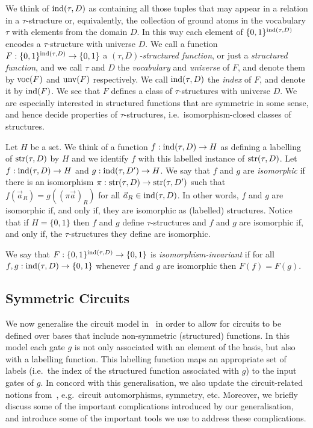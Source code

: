 \documentclass[a4paper,UKenglish]{lipics-v2018}
\begin{document}
We think of $\text{\upshape ind}(\tau, D)$ as containing all those tuples that may appear in a
relation in a $\tau$-structure or, equivalently, the collection of ground atoms
in the vocabulary $\tau$ with elements from the domain $D$. In this way each
element of $\{0,1\}^{\text{\upshape ind}(\tau, D)}$ encodes a $\tau$-structure with universe
$D$. We call a function $F : \{0,1\}^{\text{\upshape ind}(\tau, D)} \rightarrow \{0,1\}$ a
\emph{$(\tau, D)$-structured function}, or just a \emph{structured function}, and
we call $\tau$ and $D$ the \emph{vocabulary} and \emph{universe} of $F$, and
denote them by $\text{voc}(F)$ and $\text{unv}(F)$ respectively. We call $\text{\upshape ind}(\tau,
D)$ the \emph{index} of $F$, and denote it by $\text{\upshape ind}(F)$. We see that $F$ defines
a class of $\tau$-structures with universe $D$. We are especially interested in
structured functions that are symmetric in some sense, and hence decide
properties of $\tau$-structures, i.e.\ isomorphism-closed classes of structures.

Let $H$ be a set. We think of a function $f : \text{\upshape ind}(\tau, D) \rightarrow H$ as
defining a labelling of $\text{str}(\tau,D)$ by $H$ and we identify $f$ with this
labelled instance of $\text{str}(\tau, D)$. Let $f: \text{\upshape ind}(\tau, D) \rightarrow H$ and $g : \text{\upshape ind}
(\tau, D') \rightarrow H$. We say that $f$ and $g$ are \emph{isomorphic} if there is an
isomorphism $\pi : \text{str}(\tau, D) \rightarrow \text{str}(\tau, D')$ such that $f(\vec{a}_R) =
g((\pi\vec{a})_R)$ for all $\vec{a}_R \in \text{\upshape ind}(\tau, D)$. In other words, $f$
and $g$ are isomorphic if, and only if, they are isomorphic as (labelled)
structures. Notice that if $H = \{0,1\}$ then $f$ and $g$ define
$\tau$-structures and $f$ and $g$ are isomorphic if, and only if, the
$\tau$-structures they define are isomorphic.

We say that $F : \{0,1\}^{\text{\upshape ind}(\tau,D)} \rightarrow \{0,1\}$ is
\emph{isomorphism-invariant} if for all $f, g : \text{\upshape ind}(\tau, D) \rightarrow \{0,1\}$
whenever $f$ and $g$ are isomorphic then $F(f) = F(g)$.

\subsection{Symmetric Circuits}
We now generalise the circuit model in~\cite{AndersonD17} in order to allow for
circuits to be defined over bases that include non-symmetric (structured)
functions. In this model each gate $g$ is not only associated with an element of
the basis, but also with a labelling function. This labelling function maps an
appropriate set of labels (i.e.\ the index of the structured function associated
with $g$) to the input gates of $g$. In concord with this generalisation, we
also update the circuit-related notions from~\cite{AndersonD17}, e.g.\ circuit
automorphisms, symmetry, etc. Moreover, we briefly discuss some of the important
complications introduced by our generalisation, and introduce some of the
important tools we use to address these complications.
\end{document}
